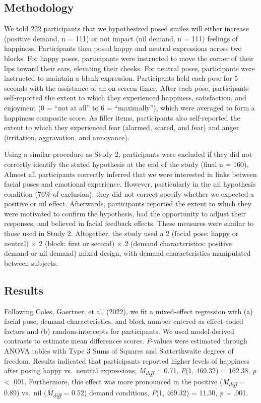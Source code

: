 \documentclass[
  man,floatsintext]{apa6}
\begin{document}
\hypertarget{methodology-2}{%
\subsection{Methodology}\label{methodology-2}}

We told 222 participants that we hypothesized posed smiles will either increase (positive demand, n = 111) or not impact (nil demand, n = 111) feelings of happiness. Participants then posed happy and neutral expressions across two blocks. For happy poses, participants were instructed to move the corner of their lips toward their ears, elevating their cheeks. For neutral poses, participants were instructed to maintain a blank expression. Participants held each pose for 5 seconds with the assistance of an on-screen timer. After each pose, participants self-reported the extent to which they experienced happiness, satisfaction, and enjoyment (0 = ``not at all'' to 6 = ``maximally''), which were averaged to form a happiness composite score. As filler items, participants also self-reported the extent to which they experienced fear (alarmed, scared, and fear) and anger (irritation, aggravation, and annoyance).

Using a similar procedure as Study 2, participants were excluded if they did not correctly identify the stated hypothesis at the end of the study (final n = 160). Almost all participants correctly inferred that we were interested in links between facial poses and emotional experience. However, particularly in the nil hypothesis condition (76\% of exclusion), they did not correct specify whether we expected a positive or nil effect. Afterwards, participants reported the extent to which they were motivated to confirm the hypothesis, had the opportunity to adjust their responses, and believed in facial feedback effects. These measures were similar to those used in Study 2. Altogether, the study used a 2 (facial pose: happy or neutral) × 2 (block: first or second) × 2 (demand characteristics: positive demand or nil demand) mixed design, with demand characteristics manipulated between subjects.

\hypertarget{results-2}{%
\subsection{Results}\label{results-2}}

Following Coles, Gaertner, et al. (2022), we fit a mixed-effect regression with (a) facial pose, demand characteristics, and block number entered as effect-coded factors and (b) random-intercepts for participants. We used model-derived contrasts to estimate mean differences scores. \emph{F}-values were estimated through ANOVA tables with Type 3 Sums of Squares and Satterthwaite degrees of freedom. Results indicated that participants reported higher levels of happiness after posing happy vs.~neutral expressions, \emph{M\textsubscript{diff}} = 0.71, \emph{F}(1, 469.32) = 162.38, \emph{p} \textless{} .001. Furthermore, this effect was more pronounced in the positive (\emph{M\textsubscript{diff}} = 0.89) vs.~nil (\emph{M\textsubscript{diff}} = 0.52) demand conditions, \emph{F}(1, 469.32) = 11.30, \emph{p =} .001.
\end{document}
